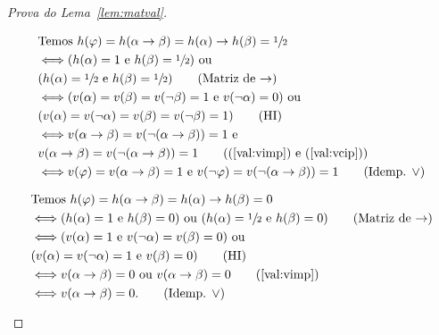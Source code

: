 \begin{proof}[Prova do Lema~\ref{lem:matval}]
\begin{provaporcasos}
\begin{provaporsubcasos}
                        \begin{align*}
                            &\textnormal{Temos }h(\phi) = h(\alpha \to \beta) = h(\alpha) \to h(\beta) = \meio{}\\
                            &\Longleftrightarrow (h(\alpha) = 1\textnormal{ e }h(\beta) = \meio{})\textnormal{ ou }\\&(h(\alpha) = \meio{}\textnormal{ e }h(\beta) = \meio{})\tag*{(Matriz de $\to$)}\\
                            &\Longleftrightarrow (v(\alpha) = v(\beta) = v(\neg \beta) = 1\textnormal{ e }v(\neg \alpha) = 0)\textnormal{ ou }\\&(v(\alpha) = v(\neg \alpha) = v(\beta) = v(\neg \beta) = 1)\tag*{(HI)}\\
                            &\Longleftrightarrow v(\alpha \to \beta) = v(\neg (\alpha \to \beta)) = 1\textnormal{ e }\\&v(\alpha \to \beta) = v(\neg (\alpha \to \beta)) = 1\tag*{((\ref{val:vimp})\textnormal{ e }(\ref{val:vcip}))}\\
                            &\Longleftrightarrow v(\phi) = v(\alpha \to \beta) = 1\textnormal{ e }v(\neg \phi) = v(\neg (\alpha \to \beta)) = 1\tag*{(Idemp. $\lor$)}
                        \end{align*}
                            
                        \begin{align*}
                            &\textnormal{Temos }h(\phi) = h(\alpha \to \beta) = h(\alpha) \to h(\beta) = 0\\
                            &\Longleftrightarrow (h(\alpha) = 1\textnormal{ e }h(\beta) = 0)\textnormal{ ou }(h(\alpha) = \meio{}\textnormal{ e }h(\beta) = 0)\tag*{(Matriz de $\to$)}\\
                            &\Longleftrightarrow (v(\alpha) = 1\textnormal{ e }v(\neg \alpha) = v(\beta) = 0)\textnormal{ ou }\\&(v(\alpha) = v(\neg \alpha) = 1\textnormal{ e }v(\beta) = 0)\tag*{(HI)}\\
                            &\Longleftrightarrow v(\alpha \to \beta) = 0\textnormal{ ou }v(\alpha \to \beta) = 0\tag*{(\ref{val:vimp})}\\
                            &\Longleftrightarrow v(\alpha \to \beta) = 0.\tag*{(Idemp. $\lor$)}
                        \end{align*}
                \end{provaporsubcasos}
            \end{provaporcasos}
        \end{proof}

